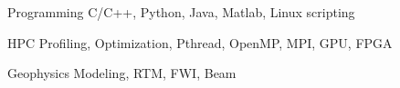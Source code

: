 

\begin{cvskills}

  \cvskill
    {Programming} %
    {C/C++, Python, Java, Matlab, Linux scripting} %

  \cvskill
    {HPC} %
    {Profiling, Optimization, Pthread, OpenMP, MPI, GPU, FPGA} %

  \cvskill
    {Geophysics} %
    {Modeling, RTM, FWI, Beam} %

\end{cvskills}
